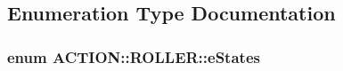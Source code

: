 \subsection{\-Enumeration \-Type \-Documentation}
\hypertarget{namespace_a_c_t_i_o_n_1_1_r_o_l_l_e_r_ae1ef7714dbb408df0bfe8c30ccf06c39}{
\subsubsection[{e\-States}]{\setlength{\rightskip}{0pt plus 5cm}enum {\bf \-A\-C\-T\-I\-O\-N\-::\-R\-O\-L\-L\-E\-R\-::e\-States}}}
\label{namespace_a_c_t_i_o_n_1_1_r_o_l_l_e_r_ae1ef7714dbb408df0bfe8c30ccf06c39}
